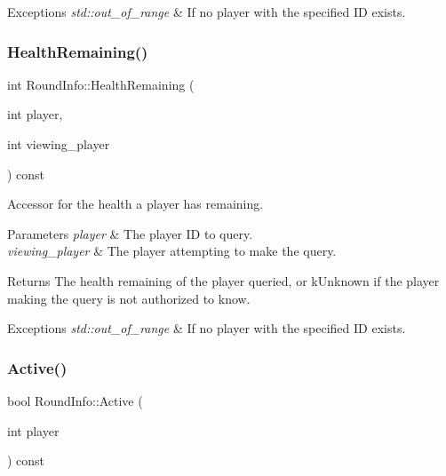 \begin{DoxyExceptions}{Exceptions}
{\em std\+::out\+\_\+of\+\_\+range} & If no player with the specified ID exists. \\
\hline
\end{DoxyExceptions}
\mbox{\label{classroundinfo_1_1_round_info_accb2ab979f9fe090cf03753ed1c78e0a}} 
\subsubsection{\texorpdfstring{Health\+Remaining()}{HealthRemaining()}}
{\footnotesize\ttfamily int Round\+Info\+::\+Health\+Remaining (\begin{DoxyParamCaption}\item[{int}]{player,  }\item[{int}]{viewing\+\_\+player }\end{DoxyParamCaption}) const}



Accessor for the health a player has remaining. 


\begin{DoxyParams}{Parameters}
{\em player} & The player ID to query. \\
\hline
{\em viewing\+\_\+player} & The player attempting to make the query. \\
\hline
\end{DoxyParams}
\begin{DoxyReturn}{Returns}
The health remaining of the player queried, or {\ttfamily k\+Unknown} if the player making the query is not authorized to know. 
\end{DoxyReturn}

\begin{DoxyExceptions}{Exceptions}
{\em std\+::out\+\_\+of\+\_\+range} & If no player with the specified ID exists. \\
\hline
\end{DoxyExceptions}
\mbox{\label{classroundinfo_1_1_round_info_a03a7ee40677506160aef2766929e6105}} 
\subsubsection{\texorpdfstring{Active()}{Active()}}
{\footnotesize\ttfamily bool Round\+Info\+::\+Active (\begin{DoxyParamCaption}\item[{int}]{player }\end{DoxyParamCaption}) const}



